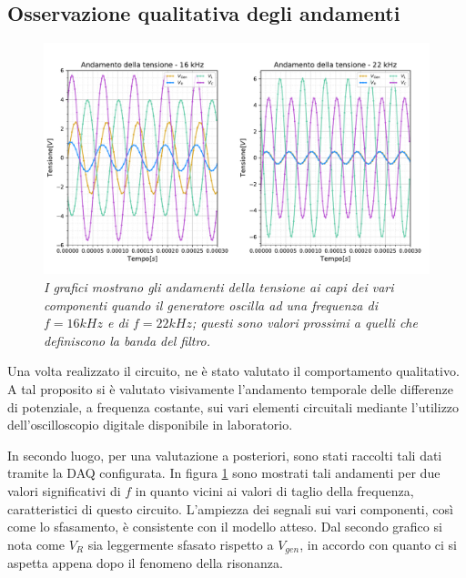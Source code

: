 \subsection{Osservazione qualitativa degli andamenti}

\begin{figure}[h!]
    \centering
    \includegraphics[width=.9\textwidth]{../figs/tensione-tempo.pdf}
    \caption{\emph{I grafici mostrano gli andamenti della tensione ai capi dei vari componenti quando il generatore
    oscilla ad una frequenza di $f=16kHz$ e di $f=22kHz$; questi sono valori prossimi a quelli che definiscono la banda del filtro.}}
    \label{fig:tensione-tempo}
\end{figure}


Una volta realizzato il circuito, ne è stato valutato il comportamento qualitativo. A tal proposito si è valutato visivamente
l'andamento temporale delle differenze di potenziale, a frequenza costante, sui vari elementi circuitali mediante
l'utilizzo dell'oscilloscopio digitale disponibile in laboratorio.

In secondo luogo, per una valutazione a posteriori, sono stati raccolti tali dati tramite la DAQ configurata.
In figura \ref{fig:tensione-tempo} sono mostrati tali andamenti per due valori significativi di $f$ in quanto vicini ai
valori di taglio della frequenza, caratteristici di questo circuito.
L'ampiezza dei segnali sui vari componenti, così come lo sfasamento, è consistente con il modello atteso. Dal secondo
grafico si nota come $V_R$ sia leggermente sfasato rispetto a $V_{gen}$, in accordo con quanto ci si aspetta appena
dopo il fenomeno della risonanza.


